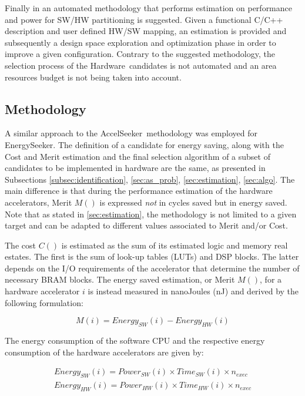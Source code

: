 \documentclass[]{usiinfthesis}
\newcommand{\aseeker}{{AccelSeeker}}
\newcommand{\eseeker}{{EnergySeeker}}
\newcommand{\HW}{{Hardware}}
\begin{document}
Finally in \cite{GruttnerNov13} an automated methodology that performs estimation on performance 
and power for SW/HW partitioning is suggested. Given a functional C/C++ description and user 
defined HW/SW mapping, an estimation is provided and subsequently a design space exploration 
and optimization phase in order to improve a given configuration. Contrary to the suggested 
methodology, the selection process of the \HW\ candidates is not automated and an area 
 resources budget is not being taken into account.
%
%
%
%
%
\subsection{Methodology}
\label{sec:meth_es}

A similar approach to the \aseeker\ methodology was employed for \eseeker. 
The definition of a candidate for energy saving, along with the Cost and Merit estimation 
and the final selection algorithm of a subset of candidates to be implemented in hardware are 
the same, as presented in Subsections \ref{subsec:identification},  
\ref{sec:as_prob}, \ref{sec:estimation}, \ref{sec:algo}. The main difference is that during
the performance estimation of the hardware accelerators, Merit $M()$ is expressed \emph{not} 
in cycles saved but in energy saved. Note that as stated in \ref{sec:estimation}, the methodology
is not limited to a given target and can be adapted to different values associated to Merit and/or
Cost.\par

The cost $C()$ is estimated as the sum of its estimated logic and memory real estates. The first is 
the sum of look-up tables (LUTs) and DSP blocks. 
The latter depends on the I/O requirements of the accelerator that determine the number of necessary 
BRAM blocks. The energy saved estimation, or Merit $M()$, for a hardware accelerator $i$ is instead 
measured in nanoJoules (nJ) and derived by the following formulation:

\begin{equation*}
M(i)  = Energy_{SW}(i) - Energy_{HW}(i)
\label{eq:energy_simple}
\end{equation*}

The energy consumption of the software CPU and the respective energy consumption of the hardware
accelerators are given by:

\begin{equation*}
\begin{aligned}
Energy_{SW}(i) = Power_{SW}(i) \times Time_{SW}(i) \times n_{exec}\\
Energy_{HW}(i) = Power_{HW}(i) \times Time_{HW}(i) \times n_{exec}\\
\end{aligned}
\end{equation*}
\end{document}
